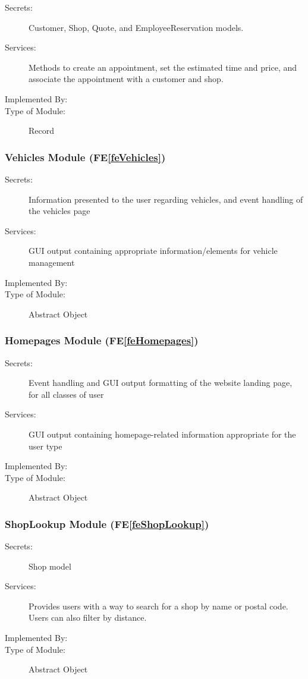 \documentclass[12pt, titlepage]{article}
\newcommand{\feref}[1]{FE\ref{#1}}
\newcommand{\labelfedef}[1]{\label{fe#1def}}
\begin{document}
\begin{description}
\item[Secrets:] Customer, Shop, Quote, and EmployeeReservation models.
\item[Services:] Methods to create an appointment, set the estimated time and price, and associate the appointment with a customer and shop. 
\item[Implemented By:] \progname
\item[Type of Module:] Record
\end{description}

\subsubsection{Vehicles Module (\feref{feVehicles}) \labelfedef{Vehicles}}
\begin{description}
    \item[Secrets:] Information presented to the user regarding vehicles, and event handling of the vehicles page
    \item[Services:] GUI output containing appropriate information/elements for vehicle management
    \item[Implemented By:] \progname
    \item[Type of Module:] Abstract Object
\end{description}

\subsubsection{Homepages Module (\feref{feHomepages}) \labelfedef{Homepages}}
\begin{description}
    \item[Secrets:] Event handling and GUI output formatting of the website landing page, for all classes of user
    \item[Services:] GUI output containing homepage-related information appropriate for the user type
    \item[Implemented By:] \progname
    \item[Type of Module:] Abstract Object
\end{description}

\subsubsection{ShopLookup Module (\feref{feShopLookup}) \labelfedef{ShopLookup}}

\begin{description}
\item[Secrets:] Shop model
\item[Services:] Provides users with a way to search for a shop by name or postal code. Users can also filter by distance. 
\item[Implemented By:] \progname
\item[Type of Module:] Abstract Object
\end{description}
\end{document}
